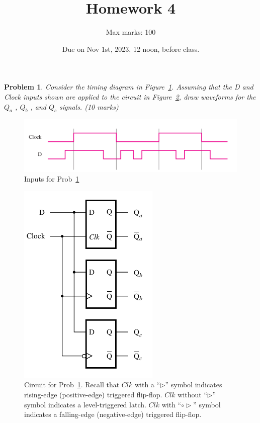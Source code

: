 \documentclass[twocolumn]{article}
\title{Homework 4}
\author{Max marks: 100}
\date{Due on Nov 1st, 2023, 12 noon, before class.}
\newtheorem{prob}{Problem}
\begin{document}
\maketitle
\begin{prob}
  Consider the timing diagram in Figure~\ref{fig:p51}. Assuming that the D and Clock inputs shown
  are applied to the circuit in Figure~\ref{fig:5.10}, draw waveforms for the
  $Q_a$ , $Q_b$ , and $Q_c$ signals. (10 marks)~\cite[Prob 5.1]{brown2013fundamentals}
  \label{prob:1}
\end{prob}
\begin{figure}[h]
  \includegraphics[width=\linewidth]{fig-p5.1.png}
  \caption{Inputs for Prob~\ref{prob:1}}
  \label{fig:p51}
\end{figure}
\begin{figure}[ht!]
  \includegraphics[width=0.7\linewidth]{fig-5.10.png}
  \caption{Circuit for Prob~\ref{prob:1}.
    Recall that $Clk$ with a ``$\triangleright$'' symbol
    indicates rising-edge (positive-edge) triggered flip-flop. $Clk$ without
    ``$\triangleright$'' symbol indicates a level-triggered latch.
    $Clk$ with ``$\circ\triangleright$'' symbol
    indicates a falling-edge (negative-edge) triggered flip-flop. 
  }
  \label{fig:5.10}
\end{figure}
\end{document}
